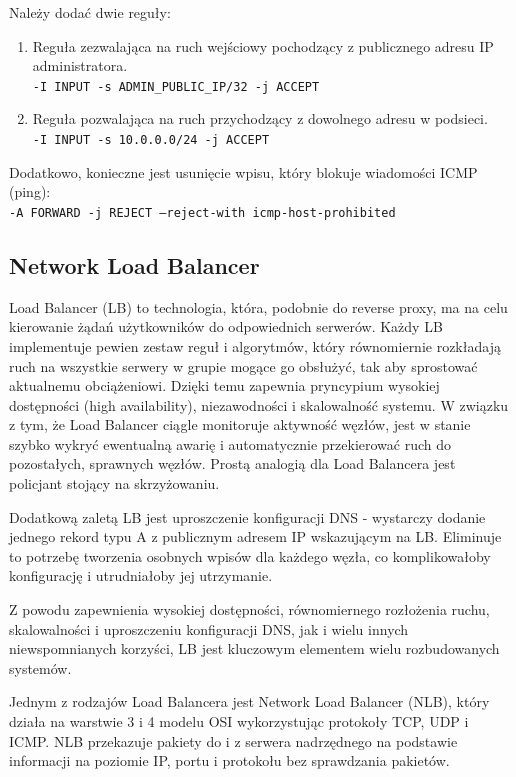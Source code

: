 \noindent Należy dodać dwie reguły:

\begin{enumerate}
    \item Reguła zezwalająca na ruch wejściowy pochodzący z publicznego adresu IP administratora.\\
    \texttt{-I INPUT -s ADMIN_PUBLIC_IP/32 -j ACCEPT}
    \item Reguła pozwalająca na ruch przychodzący z dowolnego adresu w podsieci.\\
    \texttt{-I INPUT -s 10.0.0.0/24 -j ACCEPT}
\end{enumerate}

\noindent Dodatkowo, konieczne jest usunięcie wpisu, który blokuje wiadomości ICMP (ping):\\
\texttt{-A FORWARD -j REJECT --reject-with icmp-host-prohibited}

\subsection{Network Load Balancer}

Load Balancer (LB) to technologia, która, podobnie do reverse proxy, ma na celu kierowanie żądań użytkowników do odpowiednich serwerów.
Każdy LB implementuje pewien zestaw reguł i algorytmów, który równomiernie rozkładają ruch na wszystkie serwery w grupie mogące go obsłużyć, tak aby sprostować aktualnemu obciążeniowi.
Dzięki temu zapewnia pryncypium wysokiej dostępności (high availability), niezawodności i skalowalność systemu.
W związku z tym, że Load Balancer ciągle monitoruje aktywność węzłów, jest w stanie szybko wykryć ewentualną awarię i automatycznie przekierować ruch do pozostałych, sprawnych węzłów.
Prostą analogią dla Load Balancera jest policjant stojący na skrzyżowaniu.

Dodatkową zaletą LB jest uproszczenie konfiguracji DNS - wystarczy dodanie jednego rekord typu A z publicznym adresem IP wskazującym na LB\@.
Eliminuje to potrzebę tworzenia osobnych wpisów dla każdego węzła, co komplikowałoby konfigurację i utrudniałoby jej utrzymanie.

Z powodu zapewnienia wysokiej dostępności, równomiernego rozłożenia ruchu, skalowalności i uproszczeniu konfiguracji DNS, jak i wielu innych niewspomnianych korzyści, LB jest kluczowym elementem wielu rozbudowanych systemów.

Jednym z rodzajów Load Balancera jest Network Load Balancer (NLB), który działa na warstwie 3 i 4 modelu OSI wykorzystując protokoły TCP, UDP i ICMP\@.
NLB przekazuje pakiety do i z serwera nadrzędnego na podstawie informacji na poziomie IP, portu i protokołu bez sprawdzania pakietów.

